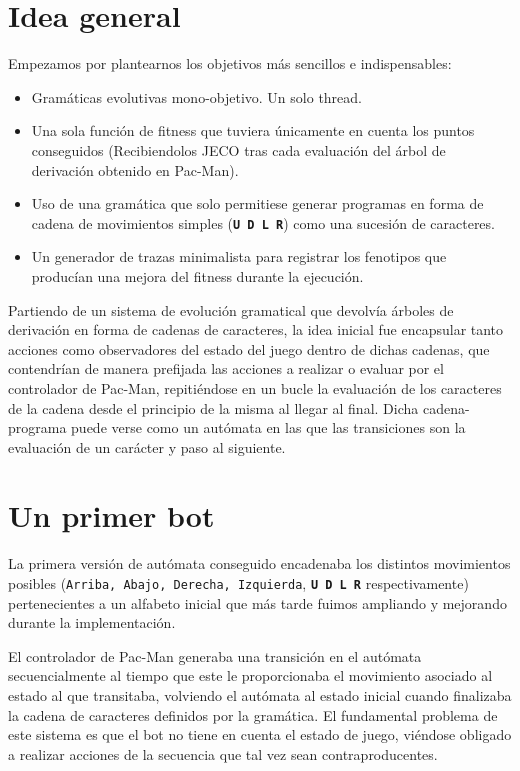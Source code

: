 \section{Idea general}
Empezamos por plantearnos los objetivos más sencillos e indispensables:
\begin{itemize}
\item Gramáticas evolutivas mono-objetivo.
Un solo thread.

\item Una sola función de fitness que tuviera únicamente en cuenta los puntos conseguidos (Recibiendolos JECO tras cada evaluación del árbol de derivación obtenido en Pac-Man).

\item Uso de una gramática que solo permitiese generar programas en forma de cadena de movimientos simples (\textbf{\texttt{U D L R}}) como una sucesión de caracteres.

\item Un generador de trazas minimalista para registrar los fenotipos que producían una mejora del fitness durante la ejecución.
\end{itemize}

Partiendo de un sistema de evolución gramatical que devolvía árboles de derivación en forma de cadenas de caracteres, la idea inicial fue encapsular tanto acciones como observadores del estado del juego dentro de dichas cadenas, que contendrían de manera prefijada las acciones a realizar o evaluar por el controlador de Pac-Man, repitiéndose en un bucle la evaluación de los caracteres de la cadena desde el principio de la misma al llegar al final. Dicha cadena-programa puede verse como un autómata en las que las transiciones son la evaluación de un carácter y paso al siguiente.

\section{Un primer bot}
La primera versión de autómata conseguido encadenaba los distintos movimientos posibles (\texttt{Arriba, Abajo, Derecha, Izquierda}, \textbf{\texttt{U D L R}} respectivamente) pertenecientes a un alfabeto inicial que más tarde fuimos ampliando y mejorando durante la implementación.
 
El controlador de Pac-Man generaba una transición en el autómata secuencialmente al tiempo que este le proporcionaba el movimiento asociado al estado al que transitaba, volviendo el autómata al estado inicial cuando finalizaba la cadena de caracteres definidos por la gramática. El fundamental problema de este sistema es que el bot no tiene en cuenta el estado de juego, viéndose obligado a realizar acciones de la secuencia que tal vez sean contraproducentes.
 

